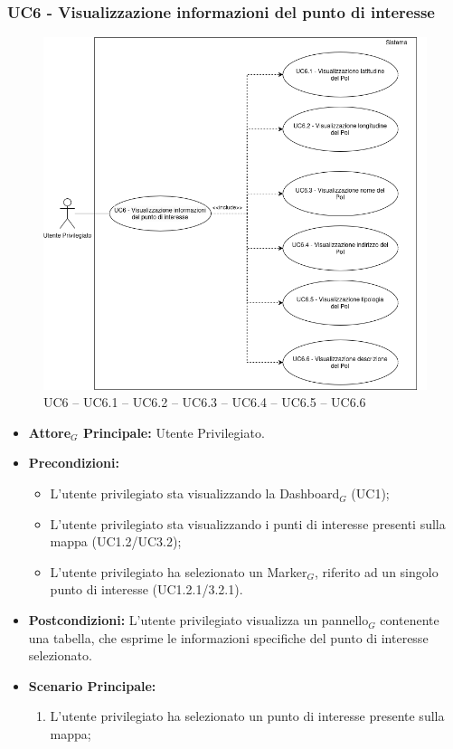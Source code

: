 \documentclass[10pt]{article}
\begin{document}
\begin{justify}
 \subsubsection{\textbf{UC6 - Visualizzazione informazioni del punto di interesse}}
\begin{figure}[H]
    \centering
    \includegraphics[width=0.7\linewidth]{UC6image.png}
    \caption{UC6 -- UC6.1 -- UC6.2 -- UC6.3 -- UC6.4 -- UC6.5 -- UC6.6}
    \label{fig:UC6}
\end{figure}
 \begin{itemize}
     \item \textbf{Attore$_G$ Principale:} Utente Privilegiato.
     \item \textbf{Precondizioni:}
       \begin{itemize}
    		\item L'utente privilegiato sta visualizzando la Dashboard$_G$ (UC1);
    	        \item L'utente privilegiato sta visualizzando i punti di interesse presenti sulla mappa (UC1.2/UC3.2);
    	        \item L'utente privilegiato ha selezionato un Marker$_G$, riferito ad un singolo punto di interesse (UC1.2.1/3.2.1).
       \end{itemize}
     \item \textbf{Postcondizioni:} L'utente privilegiato visualizza un pannello$_G$ contenente una tabella, che esprime le informazioni specifiche del punto di interesse selezionato.
     \item \textbf{Scenario Principale:}
        \begin{enumerate}
          \item L'utente privilegiato ha selezionato un punto di interesse presente sulla mappa;

\end{enumerate}
\end{itemize}
\end{justify}
\end{document}
